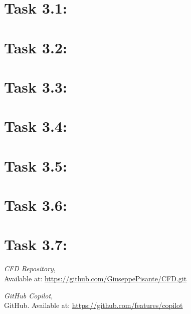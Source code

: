 \documentclass{article}
\begin{document}
\section*{\Large Task 3.1:}
\section*{\Large Task 3.2:}
\section*{\Large Task 3.3:}
\section*{\Large Task 3.4:}
\section*{\Large Task 3.5:}
\section*{\Large Task 3.6:}
\section*{\Large Task 3.7:}

\begin{thebibliography}{9}
    \textit{CFD Repository},\\
    Available at: \url{https://github.com/GiuseppePisante/CFD.git}
    
    \textit{GitHub Copilot},\\
    GitHub. Available at: \url{https://github.com/features/copilot}
    \end{thebibliography}
\end{document}
